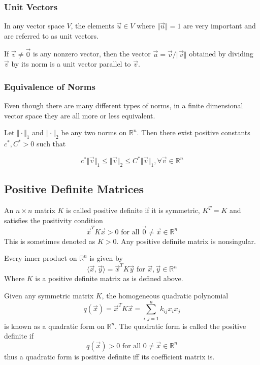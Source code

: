         \subsubsection{Unit Vectors}
        In any vector space $V$, the elements $\vec{u} \in V$ where $\Vert \vec{u} \Vert = 1$ are very important and are referred to as unit vectors.

        If $\vec{v} \neq \vec{0}$ is any nonzero vector, then the vector $\vec{u} = \vec{v} / \Vert \vec{v} \Vert$ obtained by dividing $\vec{v}$ by its norm is a unit vector parallel to $\vec{v}$.

        \subsubsection{Equivalence of Norms}
        Even though there are many different types of norms, in a finite dimensional vector space they are all more or less equivalent.

        Let $\Vert \cdot \Vert_1$ and $\Vert \cdot \Vert_2$ be any two norms on $\mathbb{R}^n$. Then there exist positive constants $c^*, C^* > 0$ such that

            \[ c^* \Vert \vec{v} \Vert_1 \leq \Vert \vec{v} \Vert_2 \leq C^* \Vert \vec{v} \Vert_1, \forall \vec{v} \in \mathbb{R}^n \]

    \subsection{Positive Definite Matrices}
    An $n \times n$ matrix $K$ is called positive definite if it is symmetric, $K^T = K$ and satisfies the positivity condition
        \[ \vec{x}^T K \vec{x} > 0 \text{ for all } \vec{0} \neq \vec{x} \in \mathbb{R}^n \]
    This is sometimes denoted as $K > 0$. Any positive definite matrix is nonsingular.

    Every inner product on $\mathbb{R}^n$ is given by
        \[ \langle \vec{x}, \vec{y} \rangle = \vec{x}^T K \vec{y} \text{ for } \vec{x}, \vec{y} \in \mathbb{R}^n \]
    Where $K$ is a positive definite matrix as is defined above.

    Given any symmetric matrix $K$, the homogeneous quadratic polynomial
        \[ q(\vec{x}) = \vec{x}^T K \vec{x} = \sum^n_{i, j = 1}k_{ij}x_ix_j \]
    is known as a quadratic form on $\mathbb{R}^n$. The quadratic form is called the positive definite if
        \[ q(\vec{x}) > 0 \text{ for all } 0 \neq \vec{x} \in \mathbb{R}^n \]
    thus a quadratic form is positive definite iff its coefficient matrix is.

